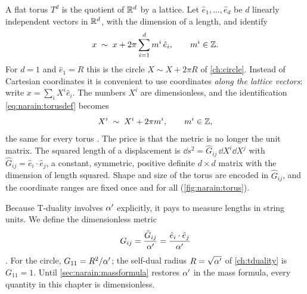 A flat torus $T^d$ is the quotient of $\mathbb{R}^d$ by a lattice. Let $\hat e_1,\dots,\hat e_d$ be
$d$ linearly independent vectors in $\mathbb{R}^d$, with the dimension of a length, and identify
\begin{equation}\label{eq:narain:torusdef}
 x\;\sim\;x+2\pi\sum_{i=1}^{d}m^i\,\hat e_i,\qquad m^i\in\mathbb{Z} .
\end{equation}
For $d=1$ and $\hat e_1=R$ this is the circle $X\sim X+2\pi R$ of \cref{ch:circle}. Instead of
Cartesian coordinates it is convenient to use coordinates \emph{along the lattice vectors}:
write $x=\sum_iX^i\hat e_i$. The numbers $X^i$ are dimensionless, and the identification
\eqref{eq:narain:torusdef} becomes
\begin{equation}\label{eq:narain:period}
 X^i\;\sim\;X^i+2\pi m^i ,\qquad m^i\in\mathbb{Z},
\end{equation}
the same for every torus . The price is that
the metric is no longer the unit matrix. The squared length of a displacement is
$\dd s^2=\hat G_{ij}\,\dd X^i\dd X^j$ with $\hat G_{ij}=\hat e_i\cdot\hat e_j$, a constant,
symmetric, positive definite $d\times d$ matrix with the dimension of length squared. Shape
and size of the torus are encoded in $\hat G_{ij}$, and the coordinate ranges are fixed once
and for all (\cref{fig:narain:torus}).

Because T-duality involves $\alpha'$ explicitly, it pays to measure lengths in string units. We
define the dimensionless metric
\begin{equation}\label{eq:narain:Gdimless}
 G_{ij}=\frac{\hat G_{ij}}{\alpha'}=\frac{\hat e_i\cdot\hat e_j}{\alpha'}
\end{equation}
. For the circle, $G_{11}=R^2/\alpha'$; the self-dual radius
$R=\sqrt{\alpha'}$ of \cref{ch:tduality} is $G_{11}=1$. Until \cref{sec:narain:massformula}
restores $\alpha'$ in the mass formula, every quantity in this chapter is dimensionless.

